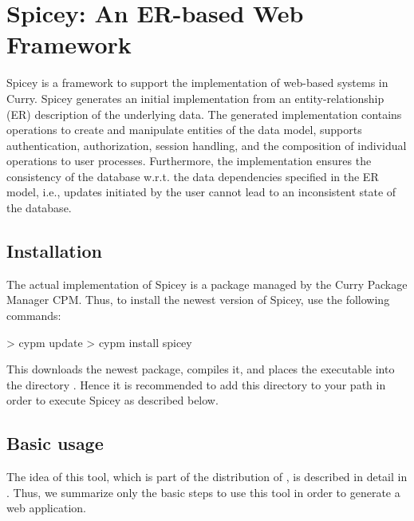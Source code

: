 \section{Spicey: An ER-based Web Framework}
\label{sec-spicey}

Spicey is a framework to support the implementation of
web-based systems in Curry. Spicey generates an initial implementation
from an entity-relationship (ER) description of the underlying
data. The generated implementation contains operations to create and
manipulate entities of the data model, supports authentication,
authorization, session handling, and the composition of individual
operations to user processes. Furthermore, the implementation ensures
the consistency of the database w.r.t. the data dependencies specified
in the ER model, i.e., updates initiated by the user cannot lead to an
inconsistent state of the database.

\subsection{Installation}

The actual implementation of Spicey is a package
managed by the Curry Package Manager CPM.
Thus, to install the newest version of Spicey, use the following commands:
%
\begin{curry}
> cypm update
> cypm install spicey
\end{curry}
%
This downloads the newest package, compiles it, and places
the executable  into the directory .
Hence it is recommended to add this directory to your path
in order to execute Spicey as described below.

\subsection{Basic usage}

The idea of this tool, which is part of the distribution of \CYS,
is described in detail in \cite{HanusKoschnicke14TPLP}.
Thus, we summarize only the basic steps to use this tool
in order to generate a web application.

